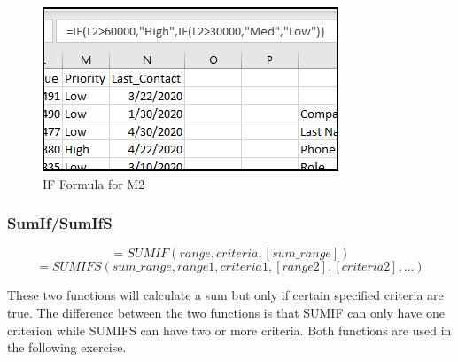 \begin{enumerate}
	\begin{figure}[H]
		\centering
		\includegraphics[width=\maxwidth{.75\linewidth}]{gfx/ch09_fig41}
		\caption{IF Formula for M2}
		\label{09:fig41}
	\end{figure}
	
\end{enumerate}

\subsubsection{SumIf/SumIfS}

\[ =SUMIF(range, criteria, [sum\_range]) \]
\[ =SUMIFS(sum\_range, range1, criteria1, [range2], [criteria2], ...) \]

These two functions will calculate a sum but only if certain specified criteria are true. The difference between the two functions is that SUMIF can only have one criterion while SUMIFS can have two or more criteria. Both functions are used in the following exercise.

